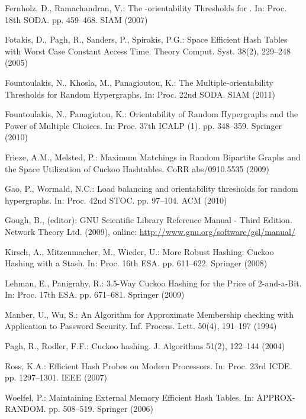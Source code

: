 \let\accentvec\vec \documentclass{llncs}
\begin{document}
\begin{thebibliography}{10}
Fernholz, D., Ramachandran, V.: {The -orientability Thresholds for 
  }. In: Proc. 18th SODA. pp. 459--468. SIAM (2007)

Fotakis, D., Pagh, R., Sanders, P., Spirakis, P.G.: {Space Efficient Hash
  Tables with Worst Case Constant Access Time}. Theory Comput. Syst.  38(2),
  229--248 (2005)

Fountoulakis, N., Khosla, M., Panagioutou, K.: {The Multiple-orientability
  Thresholds for Random Hypergraphs}. In: Proc. 22nd SODA. SIAM (2011)

Fountoulakis, N., Panagiotou, K.: {Orientability of Random Hypergraphs and the
  Power of Multiple Choices}. In: Proc. 37th ICALP (1). pp. 348--359. Springer
  (2010)

Frieze, A.M., Melsted, P.: {Maximum Matchings in Random Bipartite Graphs and
  the Space Utilization of Cuckoo Hashtables}. CoRR  abs/0910.5535 (2009)

Gao, P., Wormald, N.C.: {Load balancing and orientability thresholds for random
  hypergraphs}. In: Proc. 42nd STOC. pp. 97--104. ACM (2010)

Gough, B., (editor): {GNU Scientific Library Reference Manual - Third Edition}.
  Network Theory Ltd. (2009), online:
  \url{http://www.gnu.org/software/gsl/manual/}

Kirsch, A., Mitzenmacher, M., Wieder, U.: {More Robust Hashing: Cuckoo Hashing
  with a Stash}. In: Proc. 16th ESA. pp. 611--622. Springer (2008)

Lehman, E., Panigrahy, R.: {3.5-Way Cuckoo Hashing for the Price of
  2-and-a-Bit}. In: Proc. 17th ESA. pp. 671--681. Springer (2009)

Manber, U., Wu, S.: {An Algorithm for Approximate Membership checking with
  Application to Password Security}. Inf. Process. Lett.  50(4),  191--197
  (1994)

Pagh, R., Rodler, F.F.: {Cuckoo hashing}. J. Algorithms  51(2),  122--144
  (2004)

Ross, K.A.: {Efficient Hash Probes on Modern Processors}. In: Proc. 23rd ICDE.
  pp. 1297--1301. IEEE (2007)

Woelfel, P.: {Maintaining External Memory Efficient Hash Tables}. In:
  APPROX-RANDOM. pp. 508--519. Springer (2006)

\end{thebibliography}
\end{document}
